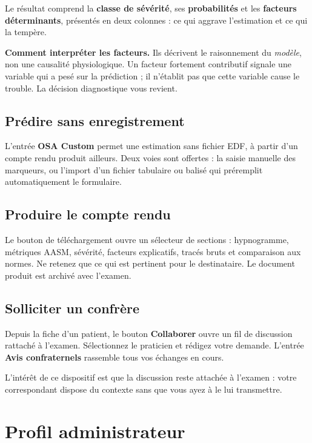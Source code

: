 Le résultat comprend la \textbf{classe de sévérité}, ses \textbf{probabilités} et les
\textbf{facteurs déterminants}, présentés en deux colonnes : ce qui aggrave
l'estimation et ce qui la tempère.

\begin{samepage}
\noindent\textbf{Comment interpréter les facteurs.} Ils décrivent le raisonnement du
\emph{modèle}, non une causalité physiologique. Un facteur fortement contributif
signale une variable qui a pesé sur la prédiction ; il n'établit pas que cette variable
cause le trouble. La décision diagnostique vous revient.
\end{samepage}

\subsection*{Prédire sans enregistrement}

L'entrée \textbf{OSA Custom} permet une estimation sans fichier EDF, à partir d'un
compte rendu produit ailleurs. Deux voies sont offertes : la saisie manuelle des
marqueurs, ou l'import d'un fichier tabulaire ou balisé qui préremplit automatiquement
le formulaire.

\subsection*{Produire le compte rendu}

Le bouton de téléchargement ouvre un sélecteur de sections : hypnogramme, métriques
AASM, sévérité, facteurs explicatifs, tracés bruts et comparaison aux normes. Ne
retenez que ce qui est pertinent pour le destinataire. Le document produit est archivé
avec l'examen.

\subsection*{Solliciter un confrère}

Depuis la fiche d'un patient, le bouton \textbf{Collaborer} ouvre un fil de discussion
rattaché à l'examen. Sélectionnez le praticien et rédigez votre demande. L'entrée
\textbf{Avis confraternels} rassemble tous vos échanges en cours.

L'intérêt de ce dispositif est que la discussion reste attachée à l'examen : votre
correspondant dispose du contexte sans que vous ayez à le lui transmettre.

\section{Profil administrateur}

